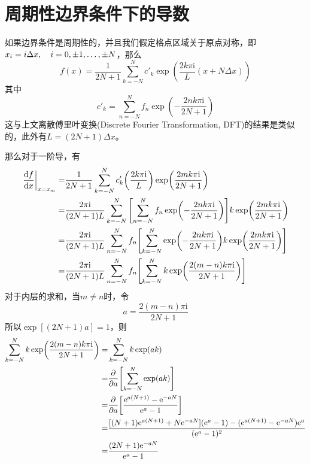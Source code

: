 \documentclass[UTF8,12pt]{article}
\begin{document}
    \section{周期性边界条件下的导数}
        如果边界条件是周期性的，并且我们假定格点区域关于原点对称，即$x_i=i\Delta x\qc i=0,\pm 1,\dots,\pm N$，那么
        \begin{equation}
            f(x)=\frac{1}{2N+1}\sum_{k=-N}^N{c'_k}\exp(\frac{2k\pi\mathrm{i}}{L}(x+N\Delta x))
        \end{equation}
        其中
        \begin{equation}
            c'_k=\sum_{n=-N}^N{f_n\exp(-\frac{2nk\pi\mathrm{i}}{2N+1})}
        \end{equation}
        这与上文离散傅里叶变换(Discrete Fourier Transformation, DFT)的结果是类似的，此外有$L=(2N+1)\Delta x$。\par
        那么对于一阶导，有
        \begin{align}
            \eval{\dv{f}{x}}_{x=x_m}=&\frac{1}{2N+1}\sum_{k=-N}^N{c'_k\qty(\frac{2k\pi\mathrm{i}}{L})\exp(\frac{2mk\pi\mathrm{i}}{2N+1})} \\
            =&\frac{2\pi\mathrm{i}}{(2N+1)L}\sum_{k=-N}^N{\qty[\sum_{n=-N}^N{f_n\exp(-\frac{2nk\pi\mathrm{i}}{2N+1})}]k\exp(\frac{2mk\pi\mathrm{i}}{2N+1})} \\
            =&\frac{2\pi\mathrm{i}}{(2N+1)L}\sum_{n=-N}^N{f_n\qty[\sum_{k=-N}^N{\exp(-\frac{2nk\pi\mathrm{i}}{2N+1})k\exp(\frac{2mk\pi\mathrm{i}}{2N+1})}]} \\
            =&\frac{2\pi\mathrm{i}}{(2N+1)L}\sum_{n=-N}^N{f_n\qty[\sum_{k=-N}^N{k\exp(\frac{2(m-n)k\pi\mathrm{i}}{2N+1})}]}
        \end{align}
        对于内层的求和，当$m\neq n$时，令
        \begin{equation}
            a=\frac{2(m-n)\pi\mathrm{i}}{2N+1}
        \end{equation}
        所以$\exp[(2N+1)a]=1$，则
        \begin{align}
            \sum_{k=-N}^N{k\exp(\frac{2(m-n)k\pi\mathrm{i}}{2N+1})}=&\sum_{k=-N}^N{k\exp(ak)} \\
            =&\pdv{a} \qty[\sum_{k=-N}^N{\exp(ak)}] \\
            =&\pdv{a} \qty[\frac{\mathrm{e}^{a(N+1)}-\mathrm{e}^{-aN}}{\mathrm{e}^{a}-1}] \\
            =&\frac{[(N+1)\mathrm{e}^{a(N+1)}+N\mathrm{e}^{-aN}](\mathrm{e}^{a}-1)-(\mathrm{e}^{a(N+1)}-\mathrm{e}^{-aN})\mathrm{e}^{a}}{(\mathrm{e}^{a}-1)^2} \\
            =&\frac{(2N+1)\mathrm{e}^{-aN}}{\mathrm{e}^{a}-1}
        \end{align}
\end{document}
